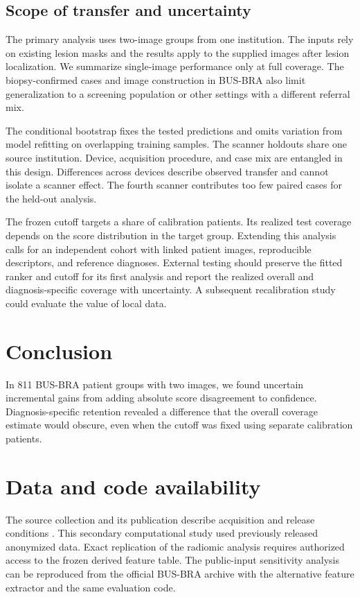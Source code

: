 \documentclass[11pt]{article}
\begin{document}
\subsection{Scope of transfer and uncertainty}
The primary analysis uses two-image groups from one institution. The inputs rely on existing lesion masks and the results apply to the supplied images after lesion localization. We summarize single-image performance only at full coverage. The biopsy-confirmed cases and image construction in BUS-BRA also limit generalization to a screening population or other settings with a different referral mix.

The conditional bootstrap fixes the tested predictions and omits variation from model refitting on overlapping training samples. The scanner holdouts share one source institution. Device, acquisition procedure, and case mix are entangled in this design. Differences across devices describe observed transfer and cannot isolate a scanner effect. The fourth scanner contributes too few paired cases for the held-out analysis.

The frozen cutoff targets a share of calibration patients. Its realized test coverage depends on the score distribution in the target group. Extending this analysis calls for an independent cohort with linked patient images, reproducible descriptors, and reference diagnoses. External testing should preserve the fitted ranker and cutoff for its first analysis and report the realized overall and diagnosis-specific coverage with uncertainty. A subsequent recalibration study could evaluate the value of local data.

\section{Conclusion}
In 811 BUS-BRA patient groups with two images, we found uncertain incremental gains from adding absolute score disagreement to confidence. Diagnosis-specific retention revealed a difference that the overall coverage estimate would obscure, even when the cutoff was fixed using separate calibration patients.

\section{Data and code availability}
The source collection and its publication describe acquisition and release conditions \cite{busbra,zenodo}. This secondary computational study used previously released anonymized data. Exact replication of the radiomic analysis requires authorized access to the frozen derived feature table. The public-input sensitivity analysis can be reproduced from the official BUS-BRA archive with the alternative feature extractor and the same evaluation code.
\end{document}
